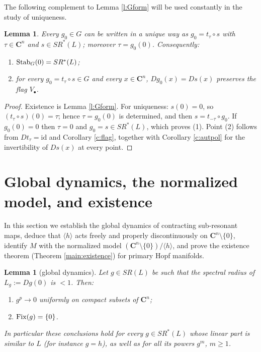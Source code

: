 \documentclass[english,11pt]{amsart}
\newtheorem{lemma}[theorem]{Lemma}
\theoremstyle{definition}
\theoremstyle{remark}
\numberwithin{equation}{section}
\newcommand{\C}{\mathbf{C}}
\newcommand{\Fix}{\mathop{\rm Fix}}
\newcommand{\Stab}{\mathop{\rm Stab}}
\begin{document}
The following complement to Lemma \ref{l:Gform} will be used constantly in the study of uniqueness.

\begin{lemma}\label{l:uniquedecomp}
Every $g_0\in G$ can be written in a unique way as $g_0=t_\tau\circ s$ with $\tau\in\C^n$ and $s\in SR^*(L)$; moreover $\tau=g_0(0)$. Consequently:
\begin{enumerate}
\item $\Stab_G(0)=SR^*(L)$;
\item for every $g_0=t_\tau\circ s\in G$ and every $x\in\C^n$, $Dg_0(x)=Ds(x)$ preserves the flag $V_\bullet$.
\end{enumerate}
\end{lemma}

\begin{proof}
Existence is Lemma \ref{l:Gform}. For uniqueness: $s(0)=0$, so $(t_\tau\circ s)(0)=\tau$; hence $\tau=g_0(0)$ is determined, and then $s=t_{-\tau}\circ g_0$. If $g_0(0)=0$ then $\tau=0$ and $g_0=s\in SR^*(L)$, which proves (1). Point (2) follows from $Dt_\tau=\mathrm{id}$ and Corollary \ref{c:flag}, together with Corollary \ref{c:autpol} for the invertibility of $Ds(x)$ at every point.
\end{proof}

\section{Global dynamics, the normalized model, and existence}\label{s:dynamics}

In this section we establish the global dynamics of contracting sub-resonant maps, deduce that $\langle h\rangle$ acts freely and properly discontinuously on $\C^n\setminus\{0\}$, identify $M$ with the normalized model $(\C^n\setminus\{0\})/\langle h\rangle$, and prove the existence theorem (Theorem \ref{main:existence}) for primary Hopf manifolds.

\begin{lemma}[global dynamics]\label{l:dynamics}
Let $g\in SR(L)$ be such that the spectral radius of $L_g:=Dg(0)$ is $<1$. Then:
\begin{enumerate}
\item $g^{p}\to0$ uniformly on compact subsets of $\C^n$;
\item $\Fix(g)=\{0\}$.
\end{enumerate}
In particular these conclusions hold for every $g\in SR^*(L)$ whose linear part is similar to $L$ (for instance $g=h$), as well as for all its powers $g^{m}$, $m\ge1$.
\end{lemma}
\end{document}
